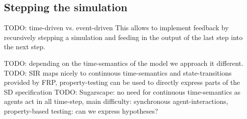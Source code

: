 \subsection{Stepping the simulation}
TODO: time-driven vs. event-driven 
This allows to implement feedback by recursively stepping a simulation and feeding in the output of the last step into the next step.

TODO: depending on the time-semantics of the model we approach it different. 
TODO: SIR maps nicely to continuous time-semantics and state-transitions provided by FRP, property-testing can be used to directly express parts of the SD specification
TODO: Sugarscape: no need for continuous time-semantics as agents act in all time-step, main difficulty: synchronous agent-interactions, property-based testing: can we express hypotheses?